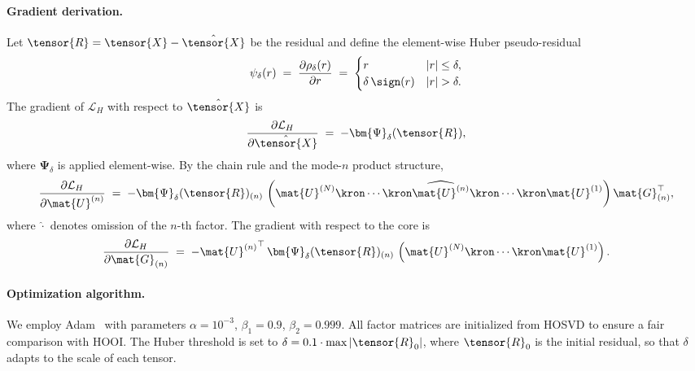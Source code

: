\paragraph{Gradient derivation.}
Let $\tensor{R} = \tensor{X} - \hat{\tensor{X}}$ be the residual and
define the element-wise Huber pseudo-residual
\begin{equation}
  \psi_\delta(r)
  \;=\; \frac{\partial \rho_\delta(r)}{\partial r}
  \;=\; \begin{cases}
          r            & |r| \leq \delta, \\
          \delta\,\sign(r) & |r| > \delta.
        \end{cases}
  \label{eq:huber_grad}
\end{equation}
The gradient of $\mathcal{L}_H$ with respect to $\hat{\tensor{X}}$ is
\begin{equation}
  \frac{\partial \mathcal{L}_H}{\partial \hat{\tensor{X}}}
  \;=\; -\bm{\Psi}_\delta(\tensor{R}),
  \label{eq:loss_grad}
\end{equation}
where $\bm{\Psi}_\delta$ is applied element-wise.
By the chain rule and the mode-$n$ product structure,
\begin{equation}
  \frac{\partial \mathcal{L}_H}{\partial \mat{U}^{(n)}}
  \;=\; -\bm{\Psi}_\delta(\tensor{R})_{(n)}\,
         \left(
           \mat{U}^{(N)} \kron \cdots \kron \widehat{\mat{U}^{(n)}}
           \kron \cdots \kron \mat{U}^{(1)}
         \right)
         \mat{G}_{(n)}^\top,
  \label{eq:grad_U}
\end{equation}
where $\widehat{\cdot}$ denotes omission of the $n$-th factor.
The gradient with respect to the core is
\begin{equation}
  \frac{\partial \mathcal{L}_H}{\partial \mat{G}_{(n)}}
  \;=\; -{\mat{U}^{(n)}}^\top\,
         \bm{\Psi}_\delta(\tensor{R})_{(n)}\,
         \left(
           \mat{U}^{(N)} \kron \cdots \kron \mat{U}^{(1)}
         \right).
  \label{eq:grad_G}
\end{equation}

\paragraph{Optimization algorithm.}
We employ Adam~\cite{kingma2015adam} with parameters
$\alpha = 10^{-3}$, $\beta_1 = 0.9$, $\beta_2 = 0.999$.
All factor matrices are initialized from HOSVD to ensure a fair comparison
with HOOI.
The Huber threshold is set to $\delta = 0.1 \cdot \max|\tensor{R}_0|$,
where $\tensor{R}_0$ is the initial residual, so that $\delta$ adapts
to the scale of each tensor.

